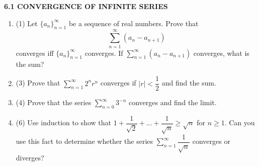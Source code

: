 \documentclass[fleqn]{article}
\begin{document}
  \textbf{6.1 CONVERGENCE OF INFINITE SERIES}
  \begin{enumerate}
    \item (1) Let $\{ a_n \}_{n=1}^{\infty}$ be a sequence of real numbers. Prove that
    $$\sum\limits_{n=1}^{\infty} (a_n-a_{n+1})$$
    converges iff $\{ a_n \}_{n=1}^{\infty}$ converges. If $\sum\limits_{n=1}^{\infty} (a_n-a_{n+1})$ converges, 
    what is the sum?

          

    \item (3) Prove that $\sum\limits_{n=1}^{\infty} 2^n r^n$ converges if $|r| < \dfrac{1}{2}$ and find the sum. 

          

    \item (4) Prove that the series $\sum\limits_{n=0}^{\infty} 3^{-n}$ converges and find the limit. 

          

    \item (6) Use induction to show that $1+\dfrac{1}{\sqrt{2}}+...+\dfrac{1}{\sqrt{n}} \geq \sqrt{n}$ for $n \geq 1$.
    Can you use this fact to determine whether the series $\sum\limits_{n=1}^{\infty} \dfrac{1}{\sqrt{n}}$ converges or diverges? 
 
          

  \end{enumerate}
\end{document}
